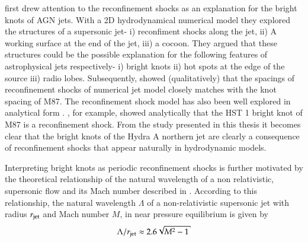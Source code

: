 \citet{norman82} first drew attention to the reconfinement shocks as an explanation for the bright knots of AGN jets. With a 2D hydrodynamical numerical model they explored the structures of a supersonic jet- i) reconfiment shocks along the jet, ii) A working surface at the end of the jet, iii) a cocoon. They argued that these structures could be the possible explanation for the following features of astrophysical jets respectively- i) bright knots ii) hot spots at the edge of the source iii) radio lobes. Subsequently, \citet{falle85} showed (qualitatively) that the spacings of reconfinement shocks of numerical jet model closely matches with the knot spacing of M87. The reconfinement shock model has also been well explored in analytical form \citep{canto89, kaiser97, komissarov97}. \citet{stawarz06}, for example, showed analytically that the HST 1 bright knot of M87 is a reconfinement shock. From the study presented in this thesis it becomes clear that the bright knots of the Hydra A northern jet are clearly a consequence of reconfinement shocks that appear naturally in hydrodynamic models. 

Interpreting bright knots as periodic reconfinement shocks is further motivated by the theoretical relationship of the natural wavelength of a non relativistic, supersonic flow and its Mach number described in \citet{birkhoff57a}. According to this relationship, the natural wavelength $\Lambda$ of a non-relativistic supersonic jet with radius $r_{\rm jet}$ and Mach number $M$, in near pressure equilibrium is given by
 \begin{equation}
\Lambda/r_{\rm jet} \approx 2.6 \sqrt{M^2 - 1}
\label{e:birkhoff}
\end{equation}


